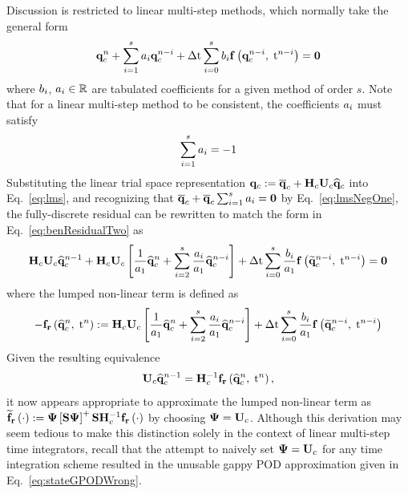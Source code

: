 Discussion is restricted to linear multi-step methods, which normally take the general form
%
\begin{equation}\label{eq:lms}
	\mathbf{q}_{c}^{n} + \sum_{i=1}^{s} a_{i} \mathbf{q}_{c}^{n-i} + \Delta \text{t} \sum_{i=0}^{s} b_{i} \mathbf{f} \left(\mathbf{q}_{c}^{n-i}, \; \text{t}^{n-i}\right) = \mathbf{0}
\end{equation}
%
where $b_{i}$, $a_{i} \in \mathbb{R}$ are tabulated coefficients for a given method of order $s$. Note that for a linear multi-step method to be consistent, the coefficients $a_{i}$ must satisfy
%
\begin{equation}\label{eq:lmsNegOne}
	\sum_{i=1}^{s} a_{i} = -1
\end{equation}
%
Substituting the linear trial space representation $\consVec \defEq \consVecCent + \consScale \consTrial \consVecCoef$ into Eq.~\ref{eq:lms}, and recognizing that $\mathbf{\overline{q}}_{c} + \mathbf{\overline{q}}_{c} \sum_{i=1}^{s} a_{i} = \mathbf{0}$ by Eq.~\ref{eq:lmsNegOne}, the fully-discrete residual can be rewritten to match the form in Eq.~\ref{eq:benResidualTwo} as
%
\begin{equation}
	\consScale \consTrial \consVecCoef^{\timeIdx-1} + \consScale \consTrial \left[\frac{1}{a_1} \consVecCoef^{\timeIdx} + \sum_{\dummyIdx=2}^{s} \frac{a_{\dummyIdx}}{a_1} \consVecCoef^{\timeIdx-\dummyIdx}\right] + \dt \sum_{\dummyIdx=0}^{s} \frac{b_{\dummyIdx}}{a_1} \rhsFunc{\consVecRom^{\timeIdx-\dummyIdx}, \; \timeVar^{\timeIdx-\dummyIdx}} = \zeroVec
\end{equation}
%
where the lumped non-linear term is defined as
%
\begin{equation}
	-\rhsResFunc{\consVecCoef^{\timeIdx},\; \timeVar^{\timeIdx}} \defEq \consScale \consTrial \left[\frac{1}{a_1} \consVecCoef^{\timeIdx} + \sum_{\dummyIdx=2}^{s} \frac{a_{\dummyIdx}}{a_1} \consVecCoef^{\timeIdx-\dummyIdx}\right] + \dt \sum_{\dummyIdx=0}^{s} \frac{b_{\dummyIdx}}{a_1} \rhsFunc{\consVecRom^{\timeIdx-\dummyIdx}, \; \timeVar^{\timeIdx-\dummyIdx}}
\end{equation}
%
Given the resulting equivalence
%
\begin{equation}
	\consTrial \consVecCoef^{\timeIdx-1} = \consScaleInv \rhsResFunc{\consVecCoef^{\timeIdx},\; \timeVar^{\timeIdx}},
\end{equation}
%
it now appears appropriate to approximate the lumped non-linear term as $\rhsResApproxFunc{\cdot} \defEq \deimBasis \left[\sampMat \deimBasis\right]^+ \sampMat \consScaleInv \rhsResFunc{\cdot}$ by choosing $\deimBasis = \consTrial$. Although this derivation may seem tedious to make this distinction solely in the context of linear multi-step time integrators, recall that the attempt to naively set $\deimBasis = \consTrial$ for any time integration scheme resulted in the unusable gappy POD approximation given in Eq.~\ref{eq:stateGPODWrong}.

